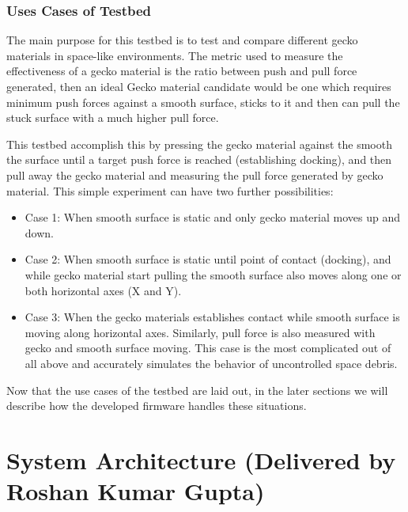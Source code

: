 \documentclass[
    twocolumn,
    fontsize = 10pt,
    parskip = half+,
    headings = small,
    headwidth = text,
    footwidth = text,
]{scrartcl}
\begin{document}
\subsubsection{Uses Cases of Testbed}
The main purpose for this testbed is to test and compare different gecko materials in space-like environments. The metric used to measure the effectiveness of a gecko material is the ratio between push and pull force generated, then an ideal Gecko material candidate would be one which requires minimum push forces against a smooth surface, sticks to it and then can pull the stuck surface with a much higher pull force.

This testbed accomplish this by pressing the gecko material against the smooth the surface until a target push force is reached (establishing docking), and then pull away the gecko material and measuring the pull force generated by gecko material. This simple experiment can have two further possibilities: 

\begin{itemize}
    \item Case 1: When smooth surface is static and only gecko material moves up and down.
    \item Case 2: When smooth surface is static until point of contact (docking), and while gecko material start pulling the smooth surface also moves along one or both horizontal axes (X and Y).
    \item Case 3: When the gecko materials establishes contact while smooth surface is moving along horizontal axes. Similarly, pull force is also measured with gecko and smooth surface moving. This case is the most complicated out of all above and accurately simulates the behavior of uncontrolled space debris.
\end{itemize}

Now that the use cases of the testbed are laid out, in the later sections we will describe how the developed firmware handles these situations. 




\section{System Architecture \textnormal{(Delivered by Roshan Kumar Gupta)}}
\label{sec:system-architecture}
\end{document}
